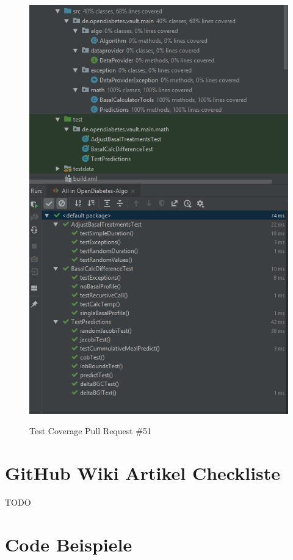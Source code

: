 \documentclass[accentcolor=tud0b,12pt,paper=a4]{tudreport}
\begin{document}
\begin{figure}[h]
\centering
\caption{Test Coverage Pull Request \#51}
\includegraphics[width=\textwidth,height=\textheight,keepaspectratio]{pr-cov-51}
\label{pr-cov:51}
\end{figure}
	
\section{GitHub Wiki Artikel Checkliste}
	TODO


\section{Code Beispiele}
\end{document}

